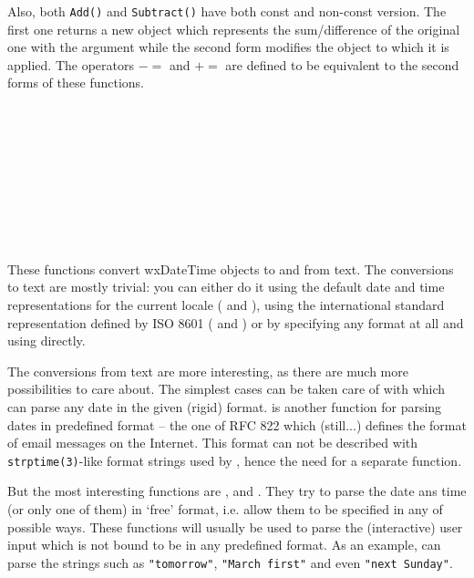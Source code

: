 Also, both {\tt Add()} and {\tt Subtract()} have both const and non-const
version. The first one returns a new object which represents the
sum/difference of the original one with the argument while the second form
modifies the object to which it is applied. The operators $-=$ and $+=$ are
defined to be equivalent to the second forms of these functions.

\\
\\
\\
\\
\\
\\
\\
\\


\label{datetimeparsing}

These functions convert wxDateTime objects to and from text. The
conversions to text are mostly trivial: you can either do it using the default
date and time representations for the current locale (
 and
), using the international standard
representation defined by ISO 8601 (
 and
) or by specifying any format
at all and using  directly.

The conversions from text are more interesting, as there are much more
possibilities to care about. The simplest cases can be taken care of with
 which can parse any date in the
given (rigid) format.  is
another function for parsing dates in predefined format -- the one of RFC 822
which (still...) defines the format of email messages on the Internet. This
format can not be described with {\tt strptime(3)}-like format strings used by
, hence the need for a separate function.

But the most interesting functions are
,
 and
. They try to parse the date
ans time (or only one of them) in `free' format, i.e. allow them to be
specified in any of possible ways. These functions will usually be used to
parse the (interactive) user input which is not bound to be in any predefined
format. As an example,  can
parse the strings such as {\tt "tomorrow"}, {\tt "March first"} and even
{\tt "next Sunday"}.

